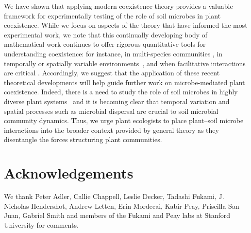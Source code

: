 We have shown that applying modern coexistence theory provides a valuable framework for experimentally testing of the role of soil microbes in plant coexistence.
While we focus on aspects of the theory that have informed the most experimental work, we note that this continually developing body of mathematical work continues to offer rigorous quantitative tools for understanding coexistence: for instance, in multi-species communities \citep{Saavedra2017}, in temporally or spatially variable environments~\citep{Ellner2019}, and when facilitative interactions are critical \citep{Bimler2018}.
Accordingly, we suggest that the application of these recent theoretical developments will help guide further work on microbe-mediated plant coexistence. Indeed, there is a need to study the role of soil microbes in highly diverse plant systems~\citep{Johnson2012} and it is becoming clear that temporal variation and spatial processes such as microbial dispersal \citep{Peay2016} are crucial to soil microbial community dynamics.
Thus, we urge plant ecologists to place plant--soil microbe interactions into the broader context provided by general theory as they disentangle the forces structuring plant communities.
\par



\section{Acknowledgements}
We thank Peter Adler, Callie Chappell, Leslie Decker, Tadashi Fukami, J. Nicholas Hendershot, Andrew Letten, Erin Mordecai, Kabir Peay, Priscilla San Juan, Gabriel Smith and members of the Fukami and Peay labs at Stanford University for comments.
\par



\clearpage
